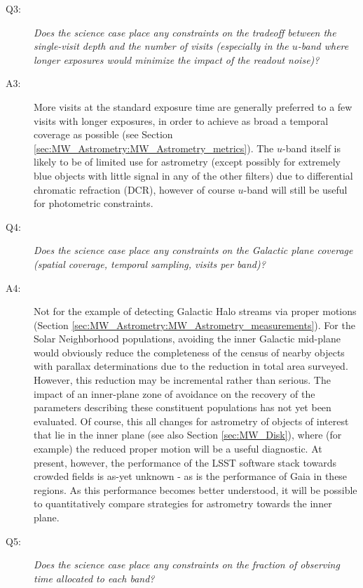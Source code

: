\begin{description}
\item[Q3:] {\it Does the science case place any constraints on the
tradeoff between the single-visit depth and the number of visits
(especially in the $u$-band where longer exposures would minimize the
impact of the readout noise)?}

\item[A3:] More visits at the standard exposure time are
  generally preferred to a few visits with longer exposures, in order
  to achieve as broad a temporal coverage as possible (see Section
  \ref{sec:MW_Astrometry:MW_Astrometry_metrics}). The $u$-band itself
  is likely to be of limited use for astrometry (except possibly for
  extremely blue objects with little signal in any of the other
  filters) due to differential chromatic refraction (DCR), however of
  course $u$-band will still be useful for photometric constraints.

\item[Q4:] {\it Does the science case place any constraints on the
Galactic plane coverage (spatial coverage, temporal sampling, visits per
band)?}

\item[A4:] Not for the example of detecting Galactic Halo
  streams via proper motions (Section
  \ref{sec:MW_Astrometry:MW_Astrometry_measurements}). For the Solar
  Neighborhood populations, avoiding the inner Galactic mid-plane
  would obviously reduce the completeness of the census of nearby
  objects with parallax determinations due to the reduction in total
  area surveyed. However, this reduction may be incremental rather
  than serious. The impact of an inner-plane zone of avoidance on the
  recovery of the parameters describing these constituent populations
  has not yet been evaluated. Of course, this all changes for
  astrometry of objects of interest that lie in the inner plane (see
  also Section \ref{sec:MW_Disk}), where (for example) the reduced
  proper motion will be a useful diagnostic. At present, however, the
  performance of the LSST software stack towards crowded fields is
  as-yet unknown - as is the performance of Gaia in these regions. As this performance becomes better understood, it
  will be possible to quantitatively compare strategies for astrometry
  towards the inner plane.

\item[Q5:] {\it Does the science case place any constraints on the
fraction of observing time allocated to each band?}


\end{description}
